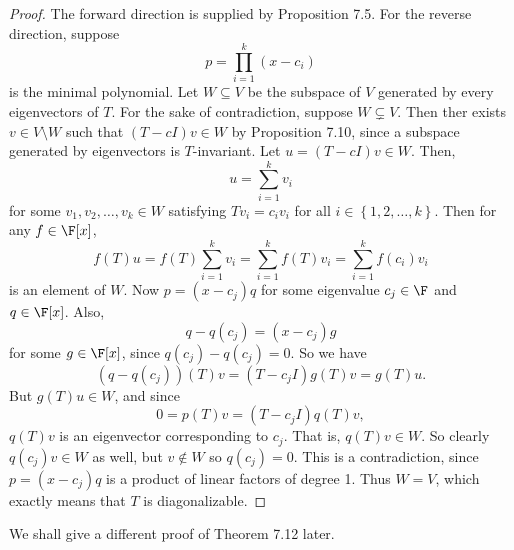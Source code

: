 \documentclass[linearalgebra]{subfiles}
\begin{document}
    \begin{proof}
        The forward direction is supplied by Proposition 7.5. For the reverse direction, suppose
        \begin{equation*}
            p = \prod^{k}_{i=1} \left( x-c_i \right) 
        \end{equation*}
        is the minimal polynomial. Let $W\subseteq V$ be the subspace of $V$ generated by every eigenvectors of $T$. For the sake of contradiction, suppose $W\subsetneq V$. Then ther exists $v\in V\setminus W$ such that $(T-cI)v\in W$ by Proposition 7.10, since a subspace generated by eigenvectors is $T$-invariant. Let $u = \left( T - cI \right)v\in W$. Then,
        \begin{equation*}
            u = \sum^{k}_{i=1} v_i
        \end{equation*}
        for some $v_1, v_2, \ldots, v_k\in W$ satisfying $Tv_i = c_iv_i$ for all $i\in \left\lbrace 1, 2, \ldots, k \right\rbrace$. Then for any $f\in \F[x]$,
        \begin{equation*}
            f(T)u = f(T) \sum^{k}_{i=1} v_i = \sum^{k}_{i=1} f(T)v_i = \sum^{k}_{i=1} f(c_i)v_i
        \end{equation*}
        is an element of $W$. Now $p = (x-c_j)q$ for some eigenvalue $c_j\in\F$ and $q\in \F[x]$. Also,
        \begin{equation*}
            q - q(c_j) = (x-c_j)g
        \end{equation*}
        for some $g\in\F[x]$, since $q(c_j) - q(c_j) = 0$. So we have
        \begin{equation*}
            \left( q -q(c_j) \right)(T)v = \left( T-c_jI \right) g(T)v = g(T)u.
        \end{equation*}
        But $g(T)u\in W$, and since
        \begin{equation*}
            0 = p(T)v = (T-c_jI)q(T)v,
        \end{equation*}
        $q(T)v$ is an eigenvector corresponding to $c_j$. That is, $q(T)v\in W$. So clearly $q(c_j)v\in W$ as well, but $v\notin W$ so $q(c_j) = 0$. This is a contradiction, since $p = (x-c_j)q$ is a product of linear factors of degree 1. Thus $W=V$, which exactly means that $T$ is diagonalizable.
    \end{proof}

    \begin{remark}
        We shall give a different proof of Theorem 7.12 later. 
    \end{remark}
\end{document}
